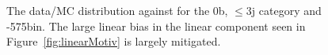 \begin{figure}[h!]
  \centering
  ~~
  \\
  ~~
  \\
  \caption{\label{fig:linearFits0bLe3} 
  The data/MC distribution against \mht for the 0b, $\le3$j category and -575\GeV bin.
  The large linear bias in the linear component seen in Figure~\ref{fig:linearMotiv} is
  largely mitigated.
}
\end{figure}

